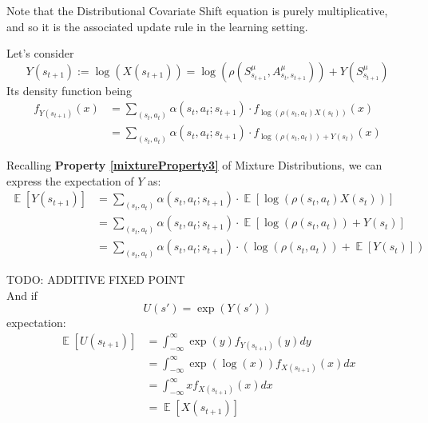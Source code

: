\documentclass[12pt,a4paper,openright,twoside]{article}
\DeclareMathOperator*{\E}{\mathbb{E}}
\numberwithin{equation}{section}
\theoremstyle{definition}
\theoremstyle{remark}
\theoremstyle{plain}
\begin{document}
Note that the Distributional Covariate Shift equation is purely multiplicative, and so it is the associated update rule in the learning setting. 


Let's consider
\begin{equation}
	Y(s_{t+1}) := \log \left( X(s_{t+1}) \right) = \log \left( \rho(S^{\mu}_{s_{t+1}},A^{\mu}_{s_{t},s_{t+1}}) \right) + Y(S^{\mu}_{s_{t+1}}) 
\end{equation}
Its density function being
\begin{equation}
\begin{split}
	f_{Y(s_{t+1})} (x) &= \sum_{(s_{t},a_{t})} \alpha(s_{t},a_{t};s_{t+1}) \cdot f_{\log\left( \rho(s_{t},a_{t}) X(s_{t}) \right)}(x) \\
	&= \sum_{(s_{t},a_{t})} \alpha(s_{t},a_{t};s_{t+1}) \cdot f_{\log\left( \rho(s_{t},a_{t})\right) + Y(s_t)}(x)
\end{split}
\end{equation}

Recalling \textbf{Property \ref{mixtureProperty3}} of Mixture Distributions, we can express the expectation of $Y$ as:
\begin{equation}
\begin{split}
	\E[Y(s_{t+1})] &= \sum_{(s_{t},a_{t})} \alpha(s_{t},a_{t};s_{t+1}) \cdot \E \left[ \log \left( \rho(s_{t},a_{t}) X(s_{t}) \right) \right] \\
	&= \sum_{(s_{t},a_{t})} \alpha(s_{t},a_{t};s_{t+1}) \cdot \E \left[ \log \left( \rho(s_{t},a_{t}) \right)  + Y(s_t) \right] \\
	&= \sum_{(s_{t},a_{t})} \alpha(s_{t},a_{t};s_{t+1}) \cdot \left( \log \left( \rho(s_{t},a_{t}) \right) + \E [Y(s_t)] \right)
\end{split}
\end{equation}

TODO: ADDITIVE FIXED POINT
\\

And if
\begin{equation}
	U(s') = \exp (Y(s'))
\end{equation}
expectation:
\begin{equation}
\begin{split}
	\E[U(s_{t+1})] &= \int_{-\infty}^{\infty} \exp(y) f_{Y(s_{t+1})} (y) dy \\
	&= \int_{-\infty}^{\infty} \exp(\log(x)) f_{X(s_{t+1})} (x) dx \\
	&=  \int_{-\infty}^{\infty} x f_{X(s_{t+1})} (x) dx  \\
	&= \E [X(s_{t+1})]
\end{split}
\end{equation}
\end{document}
